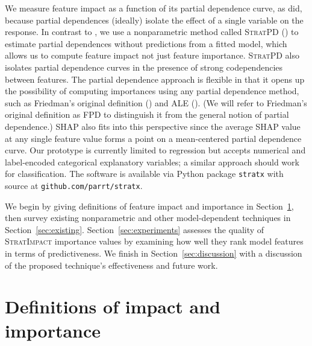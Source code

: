 \documentclass[smallextended]{svjour3}       %
\newcommand{\secref}[1]{Section~\ref{#1}}
\newcommand{\cut}[1]{}
\newcommand{\simp}{\fontfamily{cmr}\textsc{\small StratImpact}}
\newcommand{\spd}{\fontfamily{cmr}\textsc{\small StratPD}}
\begin{document}
We measure feature impact as a function of its partial dependence curve, as \cite{pdvim} did, because partial dependences (ideally) isolate the effect of a single variable on the response. In contrast to \cite{pdvim}, we use a nonparametric method called \spd{} (\citealt{stratpd}) to estimate partial dependences without predictions from a fitted model, which allows us to compute feature impact not just feature importance. \spd{} also isolates partial dependence curves in the presence of strong codependencies between features. The partial dependence approach is flexible in that it opens up the possibility of computing importances using any partial dependence method, such as Friedman's original definition (\citealt{PDP}) and ALE (\citealt{ALE}). (We will refer to Friedman's original definition as FPD to distinguish it from the general notion of partial dependence.) SHAP also fits into this perspective since the average SHAP value at any single feature value forms a point on a mean-centered partial dependence curve. Our prototype is currently limited to regression but accepts numerical and label-encoded categorical explanatory variables; a similar approach should work for classification. The software is available via Python package {\tt stratx} with source at {\tt github.com/parrt/stratx}. 

We begin by giving definitions of feature impact and importance in \secref{sec:def}, then survey existing nonparametric and other model-dependent techniques in \secref{sec:existing}. \secref{sec:experiments} assesses the quality of \simp{} importance values by examining how well they rank model features in terms of predictiveness. We finish in \secref{sec:discussion} with a discussion of the proposed technique's effectiveness and future work.

\section{Definitions of impact and importance}\label{sec:def}

\cut{Practitioners loosely define feature importance as feature predictiveness, which presupposes a fitted predictive model, probably because importances are so often used for feature selection during model development.  Research  focuses on more accurately identifying the impact of features upon model predictions.  But, relying on a fitted model makes it difficult to tease apart the true feature importance from the ability of the model to exploit that feature for prediction purposes. Rather than measuring feature impact on {\em model predictions}, we propose avoiding the model completely to define feature importance as the average impact of a feature on the {\em data set response values}.}
\end{document}
